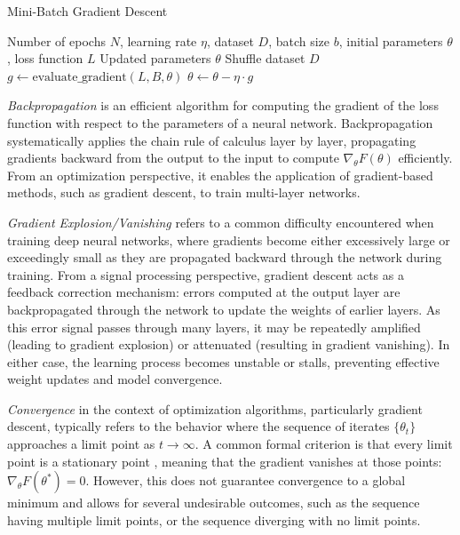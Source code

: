 \begin{itemize}
    \begin{algorithm}
      \caption{Mini-Batch Gradient Descent}
      \begin{algorithmic}[1]
        \Require Number of epochs $N$, learning rate $\eta$, dataset $D$, batch size $b$, initial parameters $\theta$, loss function $L$
        \Ensure Updated parameters $\theta$
        \State Shuffle dataset $D$
        \State $g \gets \text{evaluate\_gradient}(L, B, \theta)$
        \State $\theta \gets \theta - \eta \cdot g$
        \EndFor
        \EndFor
      \end{algorithmic}
    \end{algorithm}
\end{itemize}

\begin{definition}
  \textit{Backpropagation} \autocite{sun2020optimization} is an efficient algorithm for computing the gradient of the loss function with respect to the parameters of a neural network. Backpropagation systematically applies the chain rule of calculus layer by layer, propagating gradients backward from the output to the input to compute \( \nabla_\theta F(\theta) \) efficiently. From an optimization perspective, it enables the application of gradient-based methods, such as gradient descent, to train multi-layer networks.
\end{definition}

\begin{definition}
  \textit{Gradient Explosion/Vanishing} \autocite{sun2020optimization} refers to a common difficulty encountered when training deep neural networks, where gradients become either excessively large or exceedingly small as they are propagated backward through the network during training. From a signal processing perspective, gradient descent acts as a feedback correction mechanism: errors computed at the output layer are backpropagated through the network to update the weights of earlier layers. As this error signal passes through many layers, it may be repeatedly amplified (leading to gradient explosion) or attenuated (resulting in gradient vanishing). In either case, the learning process becomes unstable or stalls, preventing effective weight updates and model convergence.
\end{definition}

\begin{definition}
  \textit{Convergence} \autocite{sun2020optimization} in the context of optimization algorithms, particularly gradient descent, typically refers to the behavior where the sequence of iterates $\{\theta_t\}$ approaches a limit point as $t \rightarrow \infty$. A common formal criterion is that every limit point is a stationary point \autocite{bertsekas1997nonlinear}, meaning that the gradient vanishes at those points: $\nabla_\theta F(\theta^*) = 0$. However, this does not guarantee convergence to a global minimum and allows for several undesirable outcomes, such as the sequence having multiple limit points, or the sequence diverging with no limit points.
\end{definition}

